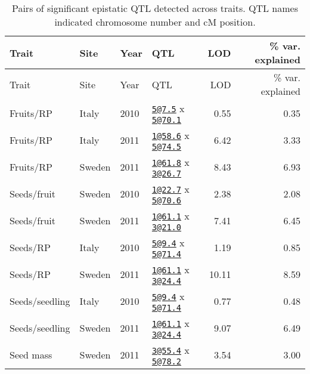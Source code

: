 \documentclass[
]{article}
\begin{document}
\newpage

\begin{longtable}[]{@{}llllrr@{}}
\caption{\label{tab:epistatic-qtl-table}Pairs of significant epistatic QTL detected across traits. QTL names indicated chromosome number and cM position.}\tabularnewline
\toprule
Trait & Site & Year & QTL & LOD & \% var. explained\tabularnewline
\midrule
\endfirsthead
\toprule
Trait & Site & Year & QTL & LOD & \% var. explained\tabularnewline
\midrule
\endhead
Fruits/RP & Italy & 2010 & \href{mailto:5@7.5}{\nolinkurl{5@7.5}} x \href{mailto:5@70.1}{\nolinkurl{5@70.1}} & 0.55 & 0.35\tabularnewline
Fruits/RP & Italy & 2011 & \href{mailto:1@58.6}{\nolinkurl{1@58.6}} x \href{mailto:5@74.5}{\nolinkurl{5@74.5}} & 6.42 & 3.33\tabularnewline
Fruits/RP & Sweden & 2011 & \href{mailto:1@61.8}{\nolinkurl{1@61.8}} x \href{mailto:3@26.7}{\nolinkurl{3@26.7}} & 8.43 & 6.93\tabularnewline
Seeds/fruit & Sweden & 2010 & \href{mailto:1@22.7}{\nolinkurl{1@22.7}} x \href{mailto:5@70.6}{\nolinkurl{5@70.6}} & 2.38 & 2.08\tabularnewline
Seeds/fruit & Sweden & 2011 & \href{mailto:1@61.1}{\nolinkurl{1@61.1}} x \href{mailto:3@21.0}{\nolinkurl{3@21.0}} & 7.41 & 6.45\tabularnewline
Seeds/RP & Italy & 2010 & \href{mailto:5@9.4}{\nolinkurl{5@9.4}} x \href{mailto:5@71.4}{\nolinkurl{5@71.4}} & 1.19 & 0.85\tabularnewline
Seeds/RP & Sweden & 2011 & \href{mailto:1@61.1}{\nolinkurl{1@61.1}} x \href{mailto:3@24.4}{\nolinkurl{3@24.4}} & 10.11 & 8.59\tabularnewline
Seeds/seedling & Italy & 2010 & \href{mailto:5@9.4}{\nolinkurl{5@9.4}} x \href{mailto:5@71.4}{\nolinkurl{5@71.4}} & 0.77 & 0.48\tabularnewline
Seeds/seedling & Sweden & 2011 & \href{mailto:1@61.1}{\nolinkurl{1@61.1}} x \href{mailto:3@24.4}{\nolinkurl{3@24.4}} & 9.07 & 6.49\tabularnewline
Seed mass & Sweden & 2011 & \href{mailto:3@55.4}{\nolinkurl{3@55.4}} x \href{mailto:5@78.2}{\nolinkurl{5@78.2}} & 3.54 & 3.00\tabularnewline
\bottomrule
\end{longtable}

\newpage
\end{document}
